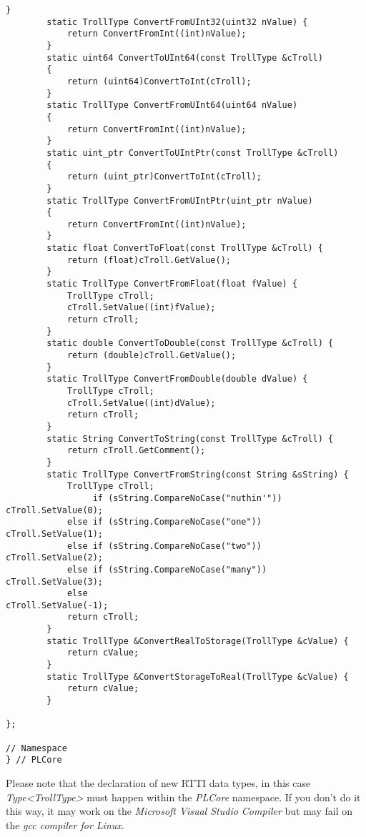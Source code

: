 \begin{lstlisting}[label=Code:UserDefinedRTTIDataTypeInline,caption={Inline of the user defined RTTI data type}]
		}
		static TrollType ConvertFromUInt32(uint32 nValue) {
			return ConvertFromInt((int)nValue);
		}
		static uint64 ConvertToUInt64(const TrollType &cTroll)
		{
			return (uint64)ConvertToInt(cTroll);
		}
		static TrollType ConvertFromUInt64(uint64 nValue)
		{
			return ConvertFromInt((int)nValue);
		}
		static uint_ptr ConvertToUIntPtr(const TrollType &cTroll)
		{
			return (uint_ptr)ConvertToInt(cTroll);
		}
		static TrollType ConvertFromUIntPtr(uint_ptr nValue)
		{
			return ConvertFromInt((int)nValue);
		}
		static float ConvertToFloat(const TrollType &cTroll) {
			return (float)cTroll.GetValue();
		}
		static TrollType ConvertFromFloat(float fValue) {
			TrollType cTroll;
			cTroll.SetValue((int)fValue);
			return cTroll;
		}
		static double ConvertToDouble(const TrollType &cTroll) {
			return (double)cTroll.GetValue();
		}
		static TrollType ConvertFromDouble(double dValue) {
			TrollType cTroll;
			cTroll.SetValue((int)dValue);
			return cTroll;
		}
		static String ConvertToString(const TrollType &cTroll) {
			return cTroll.GetComment();
		}
		static TrollType ConvertFromString(const String &sString) {
			TrollType cTroll;
				 if (sString.CompareNoCase("nuthin'"))	cTroll.SetValue(0);
			else if (sString.CompareNoCase("one"))		cTroll.SetValue(1);
			else if (sString.CompareNoCase("two"))		cTroll.SetValue(2);
			else if (sString.CompareNoCase("many"))		cTroll.SetValue(3);
			else										cTroll.SetValue(-1);
			return cTroll;
		}
		static TrollType &ConvertRealToStorage(TrollType &cValue) {
			return cValue;
		}
		static TrollType &ConvertStorageToReal(TrollType &cValue) {
			return cValue;
		}

};

// Namespace
} // PLCore
\end{lstlisting}
Please note that the declaration of new RTTI data types, in this case \emph{Type<TrollType>} must happen within the \emph{PLCore} namespace. If you don't do it this way, it may work on the \emph{Microsoft Visual Studio Compiler} but may fail on the \emph{gcc compiler for Linux}.


